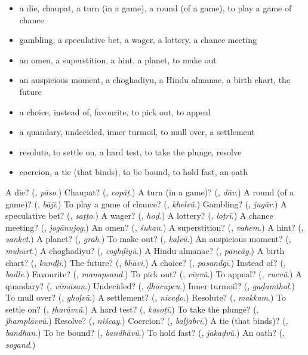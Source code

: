 \begin{itemize}
\raggedright
  \item a die, chaupat, a turn (in a game), a round (of a game), to play a game of chance
  \item gambling, a speculative bet, a wager, a lottery, a chance meeting
  \item an omen, a superstition, a hint, a planet, to make out
  \item an auspicious moment, a choghadiyu, a Hindu almanac, a birth chart, the future
  \item a choice, instead of, favourite, to pick out, to appeal
  \item a quandary, undecided, inner turmoil, to mull over, a settlement
  \item resolute, to settle on, a hard test, to take the plunge, resolve
  \item coercion, a tie (that binds), to be bound, to hold fast, an oath
\end{itemize}

\begin{tcolorbox}[breakable,colback=teal!4,colframe=teal!35!black,title={Before you move on}]
A die? (\textbf{}, \emph{pāso}.) Chaupat? (\textbf{}, \emph{copāṭ}.) A turn (in a game)? (\textbf{}, \emph{dāv}.) A round (of a game)? (\textbf{}, \emph{bājī}.) To play a game of chance? (\textbf{}, \emph{khelvũ}.) Gambling? (\textbf{}, \emph{jugār}.) A speculative bet? (\textbf{}, \emph{saṭṭo}.) A wager? (\textbf{}, \emph{hoḍ}.) A lottery? (\textbf{}, \emph{loṭrī}.) A chance meeting? (\textbf{}, \emph{jogānujog}.) An omen? (\textbf{}, \emph{śukan}.) A superstition? (\textbf{}, \emph{vahem}.) A hint? (\textbf{}, \emph{sanket}.) A planet? (\textbf{}, \emph{grah}.) To make out? (\textbf{}, \emph{kaḷvũ}.) An auspicious moment? (\textbf{}, \emph{muhūrt}.) A choghadiyu? (\textbf{}, \emph{coghḍiyũ}.) A Hindu almanac? (\textbf{}, \emph{pancā̃g}.) A birth chart? (\textbf{}, \emph{kunḍḷī}.) The future? (\textbf{}, \emph{bhāvi}.) A choice? (\textbf{}, \emph{pasandgī}.) Instead of? (\textbf{}, \emph{badle}.) Favourite? (\textbf{}, \emph{manapsand}.) To pick out? (\textbf{}, \emph{vīṇvũ}.) To appeal? (\textbf{}, \emph{rucvũ}.) A quandary? (\textbf{}, \emph{vimāsaṇ}.) Undecided? (\textbf{}, \emph{ḍhacupcu}.) Inner turmoil? (\textbf{}, \emph{gaḍamthal}.) To mull over? (\textbf{}, \emph{ghoḷvũ}.) A settlement? (\textbf{}, \emph{niveḍo}.) Resolute? (\textbf{}, \emph{makkam}.) To settle on? (\textbf{}, \emph{ṭharāvvũ}.) A hard test? (\textbf{}, \emph{kasoṭī}.) To take the plunge? (\textbf{}, \emph{jhamplāvvũ}.) Resolve? (\textbf{}, \emph{niścay}.) Coercion? (\textbf{}, \emph{baḷjabrī}.) A tie (that binds)? (\textbf{}, \emph{bandhan}.) To be bound? (\textbf{}, \emph{bandhāvũ}.) To hold fast? (\textbf{}, \emph{jakaḍvũ}.) An oath? (\textbf{}, \emph{sogand}.)
\end{tcolorbox}
